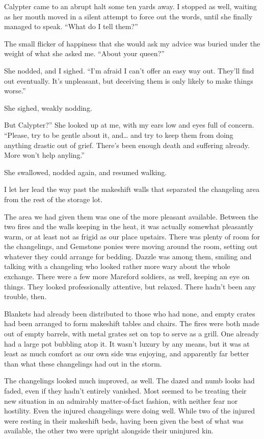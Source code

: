 Calypter came to an abrupt halt some ten yards away. I stopped as well, waiting as her mouth moved in a silent attempt to force out the words, until she finally managed to speak. “What do I tell them?”

The small flicker of happiness that she would ask my advice was buried under the weight of what she asked me. “About your queen?”

She nodded, and I sighed. “I’m afraid I can’t offer an easy way out. They’ll find out eventually. It’s unpleasant, but deceiving them is only likely to make things worse.”

She sighed, weakly nodding.

\leavevmode{}But Calypter?” She looked up at me, with my ears low and eyes full of concern. “Please, try to be gentle about it, and… and try to keep them from doing anything drastic out of grief. There’s been enough death and suffering already. More won’t help anyling.”

She swallowed, nodded again, and resumed walking.

I let her lead the way past the makeshift walls that separated the changeling area from the rest of the storage lot.

The area we had given them was one of the more pleasant available. Between the two fires and the walls keeping in the heat, it was actually somewhat pleasantly warm, or at least not as frigid as our place upstairs. There was plenty of room for the changelings, and Gemstone ponies were moving around the room, setting out whatever they could arrange for bedding. Dazzle was among them, smiling and talking with a changeling who looked rather more wary about the whole exchange. There were a few more Mareford soldiers, as well, keeping an eye on things. They looked professionally attentive, but relaxed. There hadn’t been any trouble, then.

Blankets had already been distributed to those who had none, and empty crates had been arranged to form makeshift tables and chairs. The fires were both made out of empty barrels, with metal grates set on top to serve as a grill. One already had a large pot bubbling atop it. It wasn’t luxury by any means, but it was at least as much comfort as our own side was enjoying, and apparently far better than what these changelings had out in the storm.

The changelings looked much improved, as well. The dazed and numb looks had faded, even if they hadn’t entirely vanished. Most seemed to be treating their new situation in an admirably matter-of-fact fashion, with neither fear nor hostility. Even the injured changelings were doing well. While two of the injured were resting in their makeshift beds, having been given the best of what was available, the other two were upright alongside their uninjured kin.

